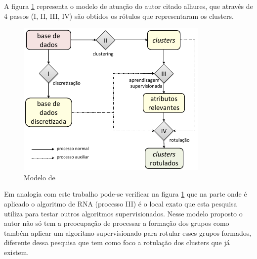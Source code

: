 A figura \ref{fig:modeloLOPES} representa o modelo de atuação do autor citado alhures, que através de 4 passos (I, II, III, IV) são obtidos os rótulos que representaram os clusters.

\begin{figure}[h]
        \centering
        \includegraphics[scale=0.8]{figs/modeloLopes.png}
        \caption{Modelo de \cite{Lopes2016}} 
        \label{fig:modeloLOPES}
\end{figure}

Em analogia com este trabalho pode-se verificar na figura \ref{fig:modeloLOPES} que na parte onde é aplicado o algoritmo  de RNA (processo III) é o local exato que esta pesquisa utiliza para testar outros algoritmos supervisionados. Nesse modelo proposto o autor não só tem a preocupação de processar  a formação dos grupos como também aplicar um algoritmo supervisionado para rotular esses grupos formados, diferente dessa pesquisa que tem como foco a rotulação dos clusters que já existem.




